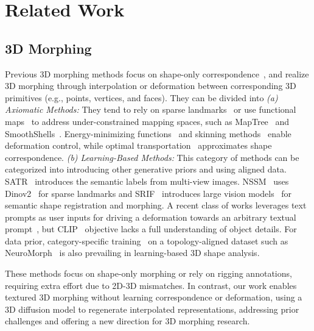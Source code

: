 \section{Related Work}
\subsection{3D Morphing}

Previous 3D morphing methods focus on shape-only correspondence~\cite{tam2012registration}, and realize 3D morphing through interpolation or deformation between corresponding 3D primitives (e.g., points, vertices, and faces). They can be divided into \textit{(a) Axiomatic Methods:} They tend to rely on sparse landmarks~\cite{kim2011blended,edelstein2019enigma} or use functional maps~\cite{ovsjanikov2012functional} to address under-constrained mapping spaces, such as MapTree~\cite{ren2020maptree} and SmoothShells~\cite{eisenberger2020smooth}. Energy-minimizing functions~\cite{sorkine2007rigid,sorkine2004laplacian} and skinning methods~\cite{fulton2019latent,jacobson2014skinning} enable deformation control, while optimal transportation~\cite{solomon2015convolutional,tsai2022multiview} approximates shape correspondence. \textit{(b) Learning-Based Methods:} This category of methods can be categorized into introducing other generative priors and using aligned data. SATR~\cite{abdelreheem2023satr} introduces the semantic labels from multi-view images. NSSM~\cite{morreale2024neural} uses Dinov2~\cite{oquab2023dinov2} for sparse landmarks and SRIF~\cite{sun2024srif} introduces large vision models~\cite{zhang2024diffmorpher} for semantic shape registration and morphing. A recent class of works leverages text prompts as user inputs for driving a deformation towards an arbitrary textual prompt~\cite{gao2023textdeformer,mohammad2022clip,michel2022text2mesh}, but CLIP~\cite{radford2021learning} objective lacks a full understanding of object details. For data prior, category-specific training~\cite{yumer2015semantic} on a topology-aligned dataset such as NeuroMorph~\cite{eisenberger2021neuromorph} is also prevailing in learning-based 3D shape analysis. 

These methods focus on shape-only morphing or rely on rigging annotations, requiring extra effort due to 2D-3D mismatches. In contrast, our work enables textured 3D morphing without learning correspondence or deformation, using a 3D diffusion model to regenerate interpolated representations, addressing prior challenges and offering a new direction for 3D morphing research.

